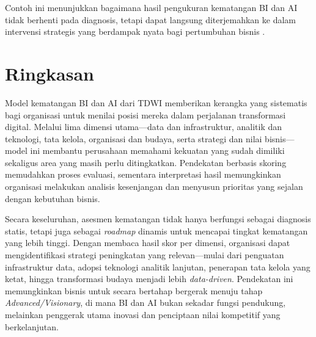 Contoh ini menunjukkan bagaimana hasil pengukuran kematangan BI dan AI 
tidak berhenti pada diagnosis, tetapi dapat langsung diterjemahkan ke dalam 
intervensi strategis yang berdampak nyata bagi pertumbuhan bisnis \cite{liao2021business, ekambaram2021}.

\section{Ringkasan}

Model kematangan BI dan AI dari TDWI memberikan kerangka yang sistematis bagi organisasi 
untuk menilai posisi mereka dalam perjalanan transformasi digital. 
Melalui lima dimensi utama—data dan infrastruktur, analitik dan teknologi, tata kelola, 
organisasi dan budaya, serta strategi dan nilai bisnis—model ini membantu perusahaan 
memahami kekuatan yang sudah dimiliki sekaligus area yang masih perlu ditingkatkan. 
Pendekatan berbasis skoring memudahkan proses evaluasi, 
sementara interpretasi hasil memungkinkan organisasi melakukan analisis kesenjangan 
dan menyusun prioritas yang sejalan dengan kebutuhan bisnis. 

Secara keseluruhan, asesmen kematangan tidak hanya berfungsi sebagai diagnosis statis, 
tetapi juga sebagai \textit{roadmap} dinamis untuk mencapai tingkat kematangan yang lebih tinggi. 
Dengan membaca hasil skor per dimensi, organisasi dapat mengidentifikasi strategi peningkatan 
yang relevan—mulai dari penguatan infrastruktur data, adopsi teknologi analitik lanjutan, 
penerapan tata kelola yang ketat, hingga transformasi budaya menjadi lebih \textit{data-driven}. 
Pendekatan ini memungkinkan bisnis untuk secara bertahap bergerak menuju tahap 
\textit{Advanced/Visionary}, di mana BI dan AI bukan sekadar fungsi pendukung, 
melainkan penggerak utama inovasi dan penciptaan nilai kompetitif yang berkelanjutan.


